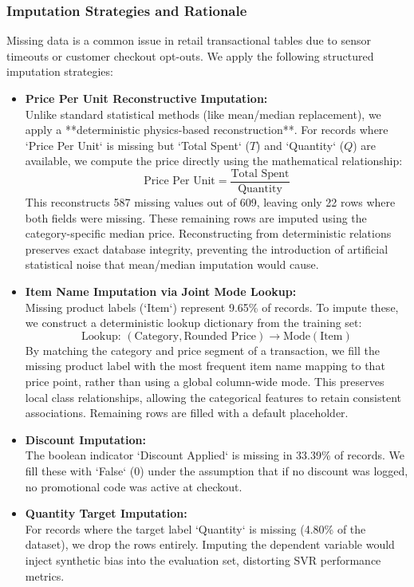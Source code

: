 \documentclass[12pt,a4paper]{article}
\begin{document}
\subsubsection{Imputation Strategies and Rationale}
Missing data is a common issue in retail transactional tables due to sensor timeouts or customer checkout opt-outs. We apply the following structured imputation strategies:
\begin{itemize}
    \item \textbf{Price Per Unit Reconstructive Imputation:}\mbox{}\\
        Unlike standard statistical methods (like mean/median replacement), we apply a **deterministic physics-based reconstruction**. For records where `Price Per Unit` is missing but `Total Spent` ($T$) and `Quantity` ($Q$) are available, we compute the price directly using the mathematical relationship:
        \[
        \text{Price Per Unit} = \frac{\text{Total Spent}}{\text{Quantity}}
        \]
        This reconstructs 587 missing values out of 609, leaving only 22 rows where both fields were missing. These remaining rows are imputed using the category-specific median price. Reconstructing from deterministic relations preserves exact database integrity, preventing the introduction of artificial statistical noise that mean/median imputation would cause.
    \item \textbf{Item Name Imputation via Joint Mode Lookup:}\mbox{}\\
        Missing product labels (`Item`) represent 9.65\% of records. To impute these, we construct a deterministic lookup dictionary from the training set:
        \[
        \text{Lookup: } (\text{Category}, \text{Rounded Price}) \rightarrow \text{Mode}(\text{Item})
        \]
        By matching the category and price segment of a transaction, we fill the missing product label with the most frequent item name mapping to that price point, rather than using a global column-wide mode. This preserves local class relationships, allowing the categorical features to retain consistent associations. Remaining rows are filled with a default placeholder.
    \item \textbf{Discount Imputation:}\mbox{}\\
        The boolean indicator `Discount Applied` is missing in 33.39\% of records. We fill these with `False` (0) under the assumption that if no discount was logged, no promotional code was active at checkout.
    \item \textbf{Quantity Target Imputation:}\mbox{}\\
        For records where the target label `Quantity` is missing (4.80\% of the dataset), we drop the rows entirely. Imputing the dependent variable would inject synthetic bias into the evaluation set, distorting SVR performance metrics.
\end{itemize}
\end{document}
